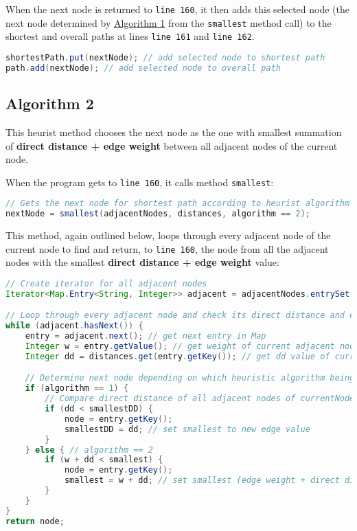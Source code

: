When the next node is returned to \texttt{line 160}, it then adds this selected node (the next node determined by \hyperref[algo1]{Algorithm 1} from the \texttt{smallest} method call) to the shortest and overall paths at lines \texttt{line 161} and \texttt{line 162}.
\begin{lstlisting}[language=Java]
shortestPath.put(nextNode); // add selected node to shortest path
path.add(nextNode); // add selected node to overall path
\end{lstlisting}

\newpage

\subsection*{Algorithm 2}
\label{algo2}
This heurist method chooses the next node as the one with smallest summation of \textbf{direct distance + edge weight} between all adjacent nodes of the current node.

When the program gets to \texttt{line 160}, it calls method \texttt{smallest}:
\begin{lstlisting}[language=Java]
// Gets the next node for shortest path according to heurist algorithm == 2
nextNode = smallest(adjacentNodes, distances, algorithm == 2);
\end{lstlisting}

This method, again outlined below, loops through every adjacent node of the current node to find and return, to \texttt{line 160}, the node from all the adjacent nodes  with the smallest \textbf{direct distance + edge weight} value:
\begin{lstlisting}[language=Java]
// Create iterator for all adjacent nodes
Iterator<Map.Entry<String, Integer>> adjacent = adjacentNodes.entrySet().iterator();

// Loop through every adjacent node and check its direct distance and edge value
while (adjacent.hasNext()) {
    entry = adjacent.next(); // get next entry in Map
    Integer w = entry.getValue(); // get weight of current adjacent node
    Integer dd = distances.get(entry.getKey()); // get dd value of current adjacent node

    // Determine next node depending on which heuristic algorithm being used
    if (algorithm == 1) {
        // Compare direct distance of all adjacent nodes of currentNode, set smallest direct distance node
        if (dd < smallestDD) {
            node = entry.getKey();
            smallestDD = dd; // set smallest to new edge value
        }
    } else { // algorithm == 2
        if (w + dd < smallest) {
            node = entry.getKey();
            smallest = w + dd; // set smallest (edge weight + direct distance)
        }
    }
}
return node;
\end{lstlisting}


